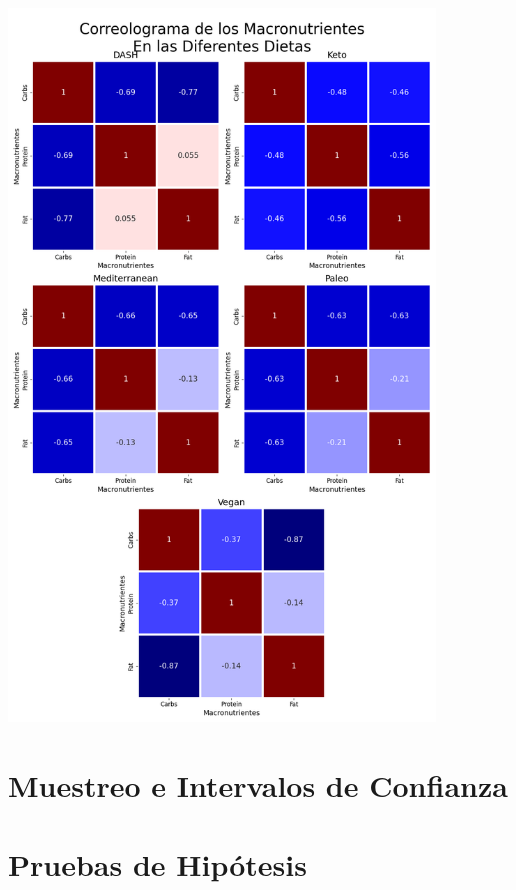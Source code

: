 \documentclass[12pt,a4paper]{article}
\begin{document}
{        \begin{center}
            \includegraphics[width=0.85\textwidth]{Resources/Bivariado/Correlation.png}
        \end{center}
    }

    \newpage

    \section{Muestreo e Intervalos de Confianza}
    {

    }

    \newpage

    \section{Pruebas de Hipótesis}
    {

    }
\end{document}

